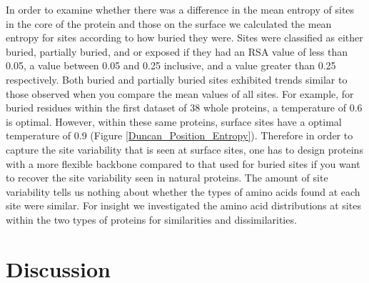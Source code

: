 \documentclass[12pt]{article}
\begin{document}
{In order to examine whether there was a difference in the mean entropy of sites in the core of the protein and those on the surface we calculated the mean entropy for sites according to how buried they were. Sites were classified as either buried, partially buried, and or exposed if they had an RSA value of less than 0.05, a value between 0.05 and 0.25 inclusive, and a value greater than 0.25 respectively. Both buried and partially buried sites exhibited trends similar to those observed when you compare the mean values of all sites. For example, for buried residues within the first dataset of 38 whole proteins, a temperature of 0.6 is optimal. However, within these same proteins, surface sites have a optimal temperature of 0.9 (Figure \ref{Duncan_Position_Entropy}). Therefore in order to capture the site variability that is seen at surface sites, one has to design proteins with a more flexible backbone compared to that used for buried sites if you want to recover the site variability seen in natural proteins. The amount of site variability tells us nothing about whether the types of amino acids found at each site were similar. For insight we investigated the amino acid distributions at sites within the two types of proteins for similarities and dissimilarities. 
}


\section{Discussion}
\end{document}
